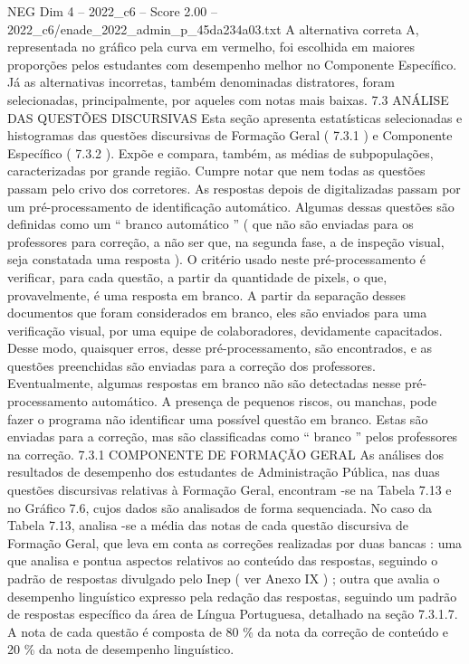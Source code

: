 \begin{textsample}{NEG Dim 4 – 2022\_c6 – Score 2.00 – 2022\_c6/enade\_2022\_admin\_p\_45da234a03.txt}
A alternativa correta A, representada no gráfico pela curva em vermelho, foi escolhida em maiores proporções pelos estudantes com desempenho melhor no Componente Específico.
Já as alternativas incorretas, também denominadas distratores, foram selecionadas, principalmente, por aqueles com notas mais baixas. 7.3 ANÁLISE DAS QUESTÕES DISCURSIVAS Esta seção apresenta estatísticas selecionadas e histogramas das questões discursivas de Formação Geral ( 7.3.1 ) e Componente Específico ( 7.3.2 ).
Expõe e compara, também, as médias de subpopulações, caracterizadas por grande região.
Cumpre notar que nem todas as questões passam pelo crivo dos corretores.
As respostas depois de digitalizadas passam por um pré-processamento de identificação automático.
Algumas dessas questões são definidas como um “ branco automático ” ( que não são enviadas para os professores para correção, a não ser que, na segunda fase, a de inspeção visual, seja constatada uma resposta ).
O critério usado neste pré-processamento é verificar, para cada questão, a partir da quantidade de pixels, o que, provavelmente, é uma resposta em branco.
A partir da separação desses documentos que foram considerados em branco, eles são enviados para uma verificação visual, por uma equipe de colaboradores, devidamente capacitados.
Desse modo, quaisquer erros, desse pré-processamento, são encontrados, e as questões preenchidas são enviadas para a correção dos professores.
Eventualmente, algumas respostas em branco não são detectadas nesse pré-processamento automático.
A presença de pequenos riscos, ou manchas, pode fazer o programa não identificar uma possível questão em branco.
Estas são enviadas para a correção, mas são classificadas como “ branco ” pelos professores na correção. 7.3.1 COMPONENTE DE FORMAÇÃO GERAL As análises dos resultados de desempenho dos estudantes de Administração Pública, nas duas questões discursivas relativas à Formação Geral, encontram -se na Tabela 7.13 e no Gráfico 7.6, cujos dados são analisados de forma sequenciada.
No caso da Tabela 7.13, analisa -se a média das notas de cada questão discursiva de Formação Geral, que leva em conta as correções realizadas por duas bancas : uma que analisa e pontua aspectos relativos ao conteúdo das respostas, seguindo o padrão de respostas divulgado pelo Inep ( ver Anexo IX ) ; outra que avalia o desempenho linguístico expresso pela redação das respostas, seguindo um padrão de respostas específico da área de Língua Portuguesa, detalhado na seção 7.3.1.7.
A nota de cada questão é composta de 80 \% da nota da correção de conteúdo e 20 \% da nota de desempenho linguístico.

\end{textsample}
